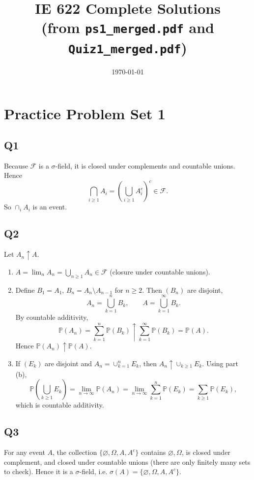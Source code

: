 \documentclass[11pt]{article}
\newcommand{\PP}{\mathbb{P}}
\newcommand{\1}{\mathbf{1}}
\begin{document}
\title{IE 622 Complete Solutions\\(from \texttt{ps1\_merged.pdf} and \texttt{Quiz1\_merged.pdf})}
\author{}
\date{\today}
\maketitle
\tableofcontents
\newpage

\section{Practice Problem Set 1}

\subsection*{Q1}
Because $\mathcal F$ is a $\sigma$-field, it is closed under complements and countable unions. Hence
\[
\bigcap_{i\ge 1} A_i = \left(\bigcup_{i\ge 1} A_i^c\right)^c \in \mathcal F.
\]
So $\cap_i A_i$ is an event.

\subsection*{Q2}
Let $A_n\uparrow A$.
\begin{enumerate}[label=(\alph*)]
\item $A=\lim_n A_n=\bigcup_{n\ge1}A_n\in\mathcal F$ (closure under countable unions).
\item Define $B_1=A_1$, $B_n=A_n\setminus A_{n-1}$ for $n\ge2$. Then $(B_n)$ are disjoint,
\[
A_n=\bigcup_{k=1}^n B_k,\qquad A=\bigcup_{k=1}^\infty B_k.
\]
By countable additivity,
\[
\PP(A_n)=\sum_{k=1}^n\PP(B_k)\uparrow\sum_{k=1}^\infty\PP(B_k)=\PP(A).
\]
Hence $\PP(A_n)\uparrow\PP(A)$.
\item If $(E_k)$ are disjoint and $A_n=\cup_{k=1}^nE_k$, then $A_n\uparrow\cup_{k\ge1}E_k$.
Using part (b),
\[
\PP\!\left(\bigcup_{k\ge1}E_k\right)=\lim_{n\to\infty}\PP(A_n)=\lim_{n\to\infty}\sum_{k=1}^n\PP(E_k)=\sum_{k\ge1}\PP(E_k),
\]
which is countable additivity.
\end{enumerate}

\subsection*{Q3}
For any event $A$, the collection $\{\varnothing,\Omega,A,A^c\}$ contains $\varnothing,\Omega$, is closed under complement, and closed under countable unions (there are only finitely many sets to check). Hence it is a $\sigma$-field, i.e. $\sigma(A)=\{\varnothing,\Omega,A,A^c\}$.
\end{document}
